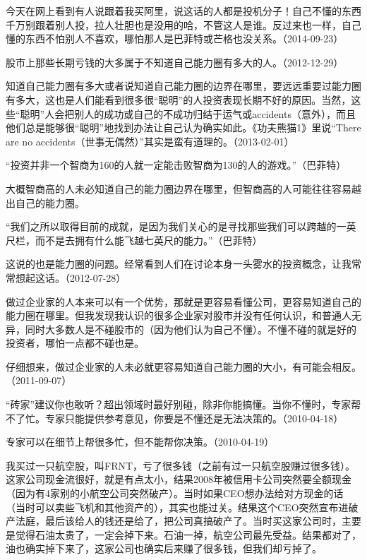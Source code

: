今天在网上看到有人说跟着我买阿里，说这话的人都是投机分子！自己不懂的东西千万别跟着别人投，拉人壮胆也是没用的哈，不管这人是谁。反过来也一样，自己懂的东西不怕别人不喜欢，哪怕那人是巴菲特或芒格也没关系。（2014-09-23）

股市上那些长期亏钱的大多属于不知道自己能力圈有多大的人。（2012-12-29）

知道自己能力圈有多大或者说知道自己能力圈的边界在哪里，要远远重要过能力圈有多大，这也是人们能看到很多很“聪明”的人投资表现长期不好的原因。当然，这些“聪明”人会把别人的成功或自己的不成功归结于运气或accidents（意外），而且他们总是能够很“聪明”地找到办法让自己认为确实如此。《功夫熊猫1》里说“There are no accidents（世事无偶然）”其实是蛮有道理的。（2013-02-01）

“投资并非一个智商为160的人就一定能击败智商为130的人的游戏。”（巴菲特）

大概智商高的人未必知道自己的能力圈边界在哪里，但智商高的人可能往往容易越出自己的能力圈。

“我们之所以取得目前的成就，是因为我们关心的是寻找那些我们可以跨越的一英尺栏，而不是去拥有什么能飞越七英尺的能力。”（巴菲特）

这说的也是能力圈的问题。经常看到人们在讨论本身一头雾水的投资概念，让我常常想起这话。（2012-07-28）

做过企业家的人本来可以有一个优势，那就是更容易看懂公司，更容易知道自己的能力圈在哪里。但我发现我认识的很多企业家对股市并没有任何认识，和普通人无异，同时大多数人是不碰股市的（因为他们认为自己不懂）。不懂不碰的就是好的投资者，哪怕一点都不碰也是。

仔细想来，做过企业家的人未必就更容易知道自己能力圈的大小，有可能会相反。（2011-09-07）


“砖家”建议你也敢听？超出领域时最好别碰，除非你能搞懂。当你不懂时，专家帮不了忙。专家只能提供参考意见，你要是不懂还是无法决策的。（2010-04-18）

专家可以在细节上帮很多忙，但不能帮你决策。（2010-04-19）


我买过一只航空股，叫FRNT，亏了很多钱（之前有过一只航空股赚过很多钱）。这家公司现金流很好，就是有点太小，结果2008年被信用卡公司突然要全额现金（因为有4家别的小航空公司突然破产）。当时如果CEO想办法给对方现金的话（当时可以卖些飞机和其他资产的），其实也能过关。结果这个CEO突然宣布进破产法庭，最后该给人的钱还是给了，把公司真搞破产了。当时买这家公司时，主要是觉得石油太贵了，一定会掉下来。石油一掉，航空公司最先受益。结果都对了，油也确实掉下来了，这家公司也确实后来赚了很多钱，但我们却亏掉了。

